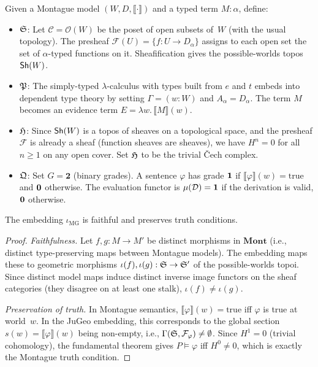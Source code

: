 \begin{construction}
\label{con:montague-embed}
Given a Montague model $(W, D, \llbracket\cdot\rrbracket)$ and a
typed term $M : \alpha$, define:
\begin{itemize}[nosep]
\item $\mathfrak{S}$: Let $\mathcal{C} = \mathcal{O}(W)$ be the poset of
  open subsets of~$W$ (with the usual topology).  The presheaf
  $\mathcal{F}(U) = \{f : U \to D_\alpha\}$ assigns to each open set
  the set of $\alpha$-typed functions on it.  Sheafification gives the
  possible-worlds topos $\mathsf{Sh}(W)$.

\item $\mathfrak{P}$: The simply-typed $\lambda$-calculus with types built
  from $e$ and $t$ embeds into dependent type theory by setting
  $\Gamma = (w : W)$ and $A_\alpha = D_\alpha$.  The term $M$ becomes
  an evidence term $E = \lambda w.\, \llbracket M \rrbracket(w)$.

\item $\mathfrak{H}$: Since $\mathsf{Sh}(W)$ is a topos of sheaves on a
  topological space, and the presheaf $\mathcal{F}$ is already a
  sheaf (function sheaves are sheaves), we have $H^n = 0$ for all
  $n \geq 1$ on any open cover.  Set $\mathfrak{H}$ to be the trivial
  \v{C}ech complex.

\item $\mathfrak{Q}$: Set $G = \mathbf{2}$ (binary grades).  A sentence
  $\varphi$ has grade $\mathbf{1}$ if $\llbracket\varphi\rrbracket(w) =
  \mathrm{true}$ and $\mathbf{0}$ otherwise.  The evaluation functor is
  $\mu(\mathcal{D}) = \mathbf{1}$ if the derivation is valid, $\mathbf{0}$
  otherwise.
\end{itemize}
\end{construction}

\begin{theorem}
\label{thm:montague}
The embedding $\iota_{\mathrm{MG}}$ is faithful and preserves
truth conditions.
\end{theorem}

\begin{proof}
\emph{Faithfulness.}  Let $f, g : M \to M'$ be distinct morphisms in
$\mathbf{Mont}$ (i.e., distinct type-preserving maps between
Montague models).  The embedding maps these to geometric morphisms
$\iota(f), \iota(g) : \mathfrak{S} \to \mathfrak{S}'$ of the possible-worlds
topoi.  Since distinct model maps induce distinct inverse image
functors on the sheaf categories (they disagree on at least one
stalk), $\iota(f) \neq \iota(g)$.

\emph{Preservation of truth.}  In Montague semantics,
$\llbracket\varphi\rrbracket(w) = \mathrm{true}$ iff $\varphi$ is
true at world~$w$.  In the JuGeo embedding, this corresponds to the
global section $s(w) = \llbracket\varphi\rrbracket(w)$ being
non-empty, i.e., $\Gamma(\mathfrak{S}, \mathcal{F}_\varphi) \neq \emptyset$.
Since $H^1 = 0$ (trivial cohomology), the fundamental theorem gives
$P \models \varphi$ iff $H^0 \neq 0$, which is exactly the Montague
truth condition.
\end{proof}

